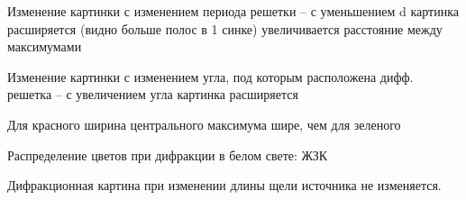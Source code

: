 Изменение картинки с изменением периода решетки -- с уменьшением d картинка расширяется (видно больше полос в 1 синке) увеличивается расстояние между максимумами

Изменение картинки с изменением угла, под которым расположена дифф. решетка -- с увеличением угла  картинка расширяется

Для красного ширина центрального максимума шире, чем для зеленого

Распределение цветов при дифракции в белом свете: ЖЗК

Дифракционная картина при изменении длины щели источника не изменяется. 

